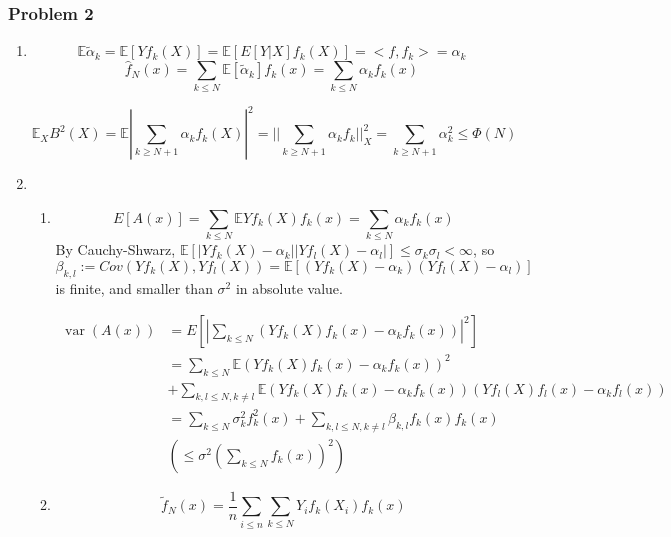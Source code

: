 \emph{}\documentclass[12pt]{article}
\DeclareMathOperator{\var}{var}
\newcommand{\Q}[1]{\subsubsection*{Problem #1}}
\begin{document}
\Q{2}
\begin{enumerate}
\item
  $$\mathbb E \tilde \alpha_k = \mathbb E[Y f_k(X)] = \mathbb E[ E[Y |
  X] f_k(X)] = <f, f_k> = \alpha_k$$
  $$\hat f_N(x) = \sum_{k \le N} \mathbb E [\tilde \alpha_k]  f_k(x) = \sum_{k \le N} \alpha_k f_k(x)$$
  
  $$\mathbb E_X B^2(X) = \mathbb E |\sum_{k \ge N+1} \alpha_k f_k(X)|^2 =  ||\sum_{k \ge N+1} \alpha_k f_k||_X^2 = \sum_{k \ge N+1} \alpha_k^2 \le \Phi(N)$$
  
\item 
  \begin{enumerate}
  \item
    $$E[A(x)] = \sum_{k \le N} \mathbb E Yf_k(X) f_k(x) = \sum_{k\le N} \alpha_k f_k(x)$$
    By Cauchy-Shwarz, $\mathbb E[ |Yf_k(X) - \alpha_k| |Yf_l(X) - \alpha_l| ] \le \sigma_k \sigma_l < \infty$,
    so $\beta_{k,l} := Cov(Y f_k(X), Yf_l(X)) = \mathbb E[ (Yf_k(X) - \alpha_k) (Yf_l(X) - \alpha_l) ]$ is finite, and smaller than $\sigma^2$ in absolute value.

    \begin{align*}
      \var(A(x))
      &= E[ |\sum_{k \le N}  (Y f_k(X) f_k(x) - \alpha_k f_k(x))|^2]
      \\ &= \sum_{k \le N} \mathbb E (Y f_k(X) f_k(x) - \alpha_k f_k(x))^2
      \\&+ \sum_{k, l \le N, k \ne l} \mathbb E (Y f_k(X) f_k(x) - \alpha_k f_k(x))(Y f_l(X) f_l(x) - \alpha_k f_l(x))
      \\ &= \sum_{k \le N} \sigma_k^2 f_k^2(x)  + \sum_{k, l \le N, k \ne l} \beta_{k,l} f_k(x)f_k(x)
      \\ & \left(\le \sigma^2 (\sum_{k \le N} f_k(x))^2 \right)
    \end{align*}
  \item
    $$\tilde f_N(x) = \frac1 n \sum_{i \le n} \sum_{k \le N} Y_if_k(X_i)f_k(x)$$
    

\end{enumerate}
\end{enumerate}
\end{document}
